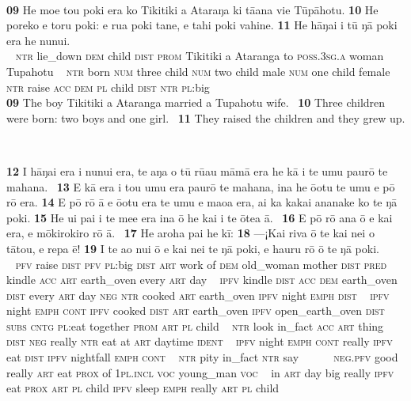 ~

\bigskip\gll
\textbf{\textup{09}} He moe tou poki era ko Tikitiki {\ꞌ}a {\ꞌ}Ataraŋa ki tā{\ꞌ}ana vi{\ꞌ}e Tūpāhotu. \textbf{\textup{10}} He poreko e toru poki: e rua poki tane, e tahi poki vahine. \textbf{\textup{11}} He hāŋai i tū ŋā poki era he nunui.\\
~ \textsc{ntr} lie\_down \textsc{dem} child \textsc{dist} \textsc{prom} Tikitiki a Ataranga to \textsc{poss.3sg.a} woman Tupahotu ~ \textsc{ntr} born \textsc{num} three child \textsc{num} two child male \textsc{num} one child female  ~ \textsc{ntr} raise \textsc{acc} \textsc{dem} \textsc{pl} child \textsc{dist} \textsc{ntr} \textsc{pl}:big\\

\medskip\glt
\textbf{\textup{09}} The boy Tikitiki a Ataranga married a Tupahotu wife. ~\textbf{\textup{10}} Three children were born: two boys and one girl. ~\textbf{\textup{11}} They raised the children and they grew up.


~

\bigskip\gll
\textbf{\textup{12}} I hāŋai era i nunui era, te aŋa o tū rū{\ꞌ}au māmā era he kā i te {\ꞌ}umu paurō te mahana. ~\textbf{\textup{13}} E kā era i tou {\ꞌ}umu era paurō te mahana, {\ꞌ}ina he {\ꞌ}ō{\ꞌ}otu te {\ꞌ}umu e pō rō era. \textbf{\textup{14}} E pō rō {\ꞌ}ā e {\ꞌ}ō{\ꞌ}otu era te {\ꞌ}umu e ma{\ꞌ}oa era, {\ꞌ}ai ka kakai ananake ko te ŋā poki. \textbf{\textup{15}} He u{\ꞌ}i pa{\ꞌ}i i te me{\ꞌ}e era {\ꞌ}ina {\ꞌ}ō he kai {\ꞌ}i te {\ꞌ}ōtea {\ꞌ}ā. ~\textbf{\textup{16}} E pō rō {\ꞌ}ana {\ꞌ}ō e kai era, e mōkirokiro rō {\ꞌ}ā. ~\textbf{\textup{17}} He {\ꞌ}aroha pa{\ꞌ}i he kī: \textbf{\textup{18}} —¡Kai riva {\ꞌ}ō te kai nei o tātou, e repa ē! \textbf{\textup{19}} {\ꞌ}I te {\ꞌ}ao nui {\ꞌ}ō e kai nei te ŋā poki, e ha{\ꞌ}uru rō {\ꞌ}ō te ŋā poki.\\
~ \textsc{pfv} raise \textsc{dist} \textsc{pfv} \textsc{pl}:big \textsc{dist} \textsc{art} work of \textsc{dem} old\_woman mother \textsc{dist} \textsc{pred} kindle \textsc{acc} \textsc{art} earth\_oven every \textsc{art} day ~ \textsc{ipfv} kindle \textsc{dist} \textsc{acc} \textsc{dem} earth\_oven \textsc{dist} every \textsc{art} day \textsc{neg} \textsc{ntr} cooked \textsc{art} earth\_oven \textsc{ipfv} night \textsc{emph} \textsc{dist}  ~ \textsc{ipfv} night \textsc{emph} \textsc{cont} \textsc{ipfv} cooked \textsc{dist} \textsc{art} earth\_oven \textsc{ipfv} open\_earth\_oven \textsc{dist} \textsc{subs} \textsc{cntg} \textsc{pl}:eat together \textsc{prom} \textsc{art} \textsc{pl} child ~ \textsc{ntr} look in\_fact \textsc{acc} \textsc{art} thing \textsc{dist} \textsc{neg} really \textsc{ntr} eat at \textsc{art} daytime \textsc{ident} ~ \textsc{ipfv} night \textsc{emph} \textsc{cont} really \textsc{ipfv} eat \textsc{dist} \textsc{ipfv} nightfall \textsc{emph} \textsc{cont} ~ \textsc{ntr} pity in\_fact \textsc{ntr} say ~ ~~~~\textsc{neg.pfv} good really \textsc{art} eat \textsc{prox} of \textsc{1pl.incl} \textsc{voc} young\_man \textsc{voc}  ~ in \textsc{art} day big really \textsc{ipfv} eat \textsc{prox} \textsc{art} \textsc{pl} child \textsc{ipfv} sleep \textsc{emph} really \textsc{art} \textsc{pl} child\\

